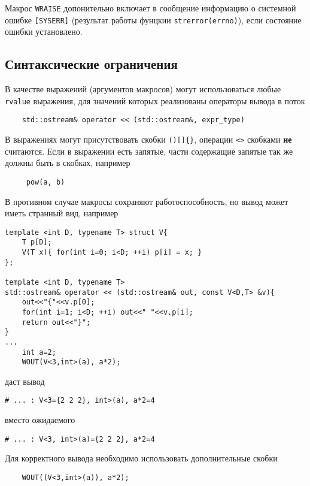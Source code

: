 Макрос \verb'WRAISE' допонительно включает в сообщение информацию о системной ошибке \verb'[SYSERR]' (результат работы
фунцкии \verb'strerror(errno)'), если состояние ошибки установлено.



\subsection{Синтаксические ограничения}
В качестве выражений (аргументов макросов) могут использоваться любые \verb'rvalue' выражения,
для значений которых реализованы операторы
вывода в поток
\begin{verbatim}
    std::ostream& operator << (std::ostream&, expr_type)
\end{verbatim}

В выражениях могут присутствовать скобки \verb'()[]{}', операции \verb'<>' скобками {\bf не} считаются.
Если в выражении есть запятые, части содержащие запятые так же должны быть в скобках, например
\begin{verbatim}
     pow(a, b)   
\end{verbatim}
В противном случае макросы сохраняют работоспособность, но вывод может иметь странный вид, например
\begin{verbatim}
template <int D, typename T> struct V{
	T p[D];
	V(T x){ for(int i=0; i<D; ++i) p[i] = x; }
};

template <int D, typename T> 
std::ostream& operator << (std::ostream& out, const V<D,T> &v){
	out<<"{"<<v.p[0];
	for(int i=1; i<D; ++i) out<<" "<<v.p[i];
	return out<<"}";
}
...
	int a=2;
	WOUT(V<3,int>(a), a*2);
\end{verbatim}
даст вывод
\begin{verbatim}
# ... : V<3={2 2 2}, int>(a), a*2=4
\end{verbatim}
вместо ожидаемого
\begin{verbatim}
# ... : V<3, int>(a)={2 2 2}, a*2=4
\end{verbatim}
Для корректного вывода необходимо использовать дополнительные скобки
\begin{verbatim}
	WOUT((V<3,int>(a)), a*2);
\end{verbatim}

